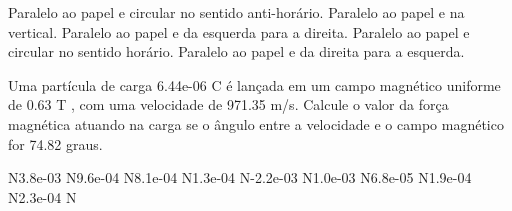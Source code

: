 \documentclass[12pt, addpoints]{exam}
\begin{document}
\begin{questions}
\begin{multicols*}{2}
\begin{choices}
\choice Paralelo ao papel e circular no sentido anti-horário. 
\choice Paralelo ao papel e na vertical. 
\choice Paralelo ao papel e da esquerda para a direita. 
\choice Paralelo ao papel e circular no sentido horário. 
\choice Paralelo ao papel e da direita para a esquerda. 
\end{choices}
\question Uma partícula de carga 6.44e-06 C é lançada em um campo magnético uniforme de    0.63 T , com uma velocidade de 971.35 m/s. Calcule o valor da força magnética atuando na carga se o ângulo entre a velocidade e o campo magnético for   74.82 graus.

\begin{oneparchoices}
 N\choice 3.8e-03 N\choice 9.6e-04 N\choice 8.1e-04 N\choice 1.3e-04 N\choice -2.2e-03 N\choice 1.0e-03 N\choice 6.8e-05 N\choice 1.9e-04 N\choice 2.3e-04 N
\end{oneparchoices}\end{multicols*}
\end{questions}
\newpage
\end{document}
